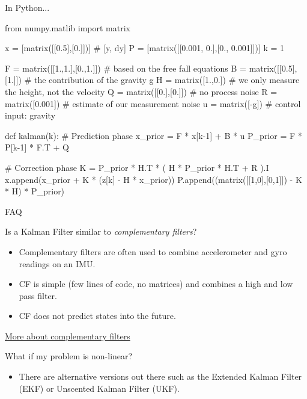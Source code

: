 \documentclass[compress]{beamer}
\begin{document}
\begin{frame}[fragile]{In Python...}

\begin{pythoncode}
from numpy.matlib import matrix

x = [matrix([[0.5],[0.]])] # [y, dy]
P = [matrix([[0.001, 0.],[0., 0.001]])]
k = 1

F = matrix([[1.,1.],[0.,1.]]) # based on the free fall equations
B = matrix([[0.5],[1.]]) # the contribution of the gravity g
H = matrix([1.,0.]) # we only measure the height, not the velocity
Q = matrix([[0.],[0.]]) # no process noise
R = matrix([0.001]) # estimate of our measurement noise
u = matrix([-g]) # control input: gravity

def kalman(k):
    # Prediction phase
    x_prior = F * x[k-1] + B * u
    P_prior = F * P[k-1] * F.T + Q

    # Correction phase
    K = P_prior * H.T * ( H * P_prior * H.T + R ).I
    x.append(x_prior + K * (z[k] - H * x_prior))
    P.append((matrix([[1,0],[0,1]]) - K * H) * P_prior)

\end{pythoncode}

\end{frame}


\begin{frame}{FAQ}

Is a Kalman Filter similar to \emph{complementary filters}?

\begin{itemize}
    \item Complementary filters are often used to combine accelerometer and gyro
  readings on an IMU.
    \item CF is simple (few lines of code, no matrices) and combines a high and
  low pass filter.
    \item CF does not predict states into the future.
\end{itemize}

\href{http://www.pieter-jan.com/node/11}{More about complementary filters}

What if my problem is non-linear?

\begin{itemize}
    \item There are alternative versions out there such as the Extended Kalman
  Filter (EKF) or Unscented Kalman Filter (UKF).
\end{itemize}


\end{frame}
\end{document}
